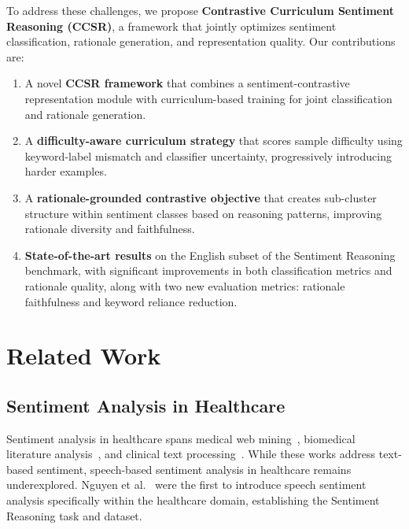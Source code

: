\documentclass[conference]{IEEEtran}
\begin{document}
To address these challenges, we propose \textbf{Contrastive Curriculum Sentiment Reasoning (CCSR)}, a framework that jointly optimizes sentiment classification, rationale generation, and representation quality. Our contributions are:

\begin{enumerate}
    \item A novel \textbf{CCSR framework} that combines a sentiment-contrastive representation module with curriculum-based training for joint classification and rationale generation.
    \item A \textbf{difficulty-aware curriculum strategy} that scores sample difficulty using keyword-label mismatch and classifier uncertainty, progressively introducing harder examples.
    \item A \textbf{rationale-grounded contrastive objective} that creates sub-cluster structure within sentiment classes based on reasoning patterns, improving rationale diversity and faithfulness.
    \item \textbf{State-of-the-art results} on the English subset of the Sentiment Reasoning benchmark, with significant improvements in both classification metrics and rationale quality, along with two new evaluation metrics: rationale faithfulness and keyword reliance reduction.
\end{enumerate}

\section{Related Work}

\subsection{Sentiment Analysis in Healthcare}

Sentiment analysis in healthcare spans medical web mining~\cite{ali2013can, na2012sentiment, sokolova2013joe}, biomedical literature analysis~\cite{niu2005analysis, sarker2011outcome}, and clinical text processing~\cite{pestian2012sentiment, cambria2012sentic}. While these works address text-based sentiment, speech-based sentiment analysis in healthcare remains underexplored. Nguyen et al.~\cite{nguyen2024sentiment} were the first to introduce speech sentiment analysis specifically within the healthcare domain, establishing the Sentiment Reasoning task and dataset.
\end{document}
